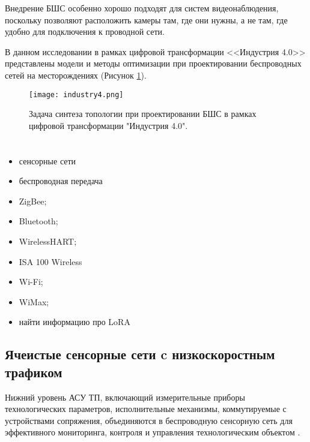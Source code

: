 Внедрение БШС особенно хорошо подходят для систем видеонаблюдения, поскольку позволяют расположить камеры там, где они нужны, а не там, где удобно для подключения к проводной сети.

В данном исследовании в рамках цифровой трансформации <<Индустрия 4.0>> представлены модели и методы оптимизации при проектировании беспроводных сетей на месторождениях  (Рисунок \cref{fig:industry4}).

\begin{figure}[h!]
  \centering
   \texttt{[image: industry4.png]}
\caption{Задача синтеза топологии при проектировании БШС в рамках цифровой трансформации "Индустрия 4.0".}
\label{fig:industry4}
\end{figure}






\section{}

\begin{itemize}
  \item сенсорные сети
  \item беспроводная передача 
\end{itemize}


\begin{itemize}
  \item ZigBee;
  \item Bluetooth;
  \item WirelessHART;
  \item ISA 100 Wireless
  \item Wi-Fi;
  \item WiMax;
  \item найти информацию про LoRA
\end{itemize}

\subsection{Ячеистые сенсорные сети c низкоскоростным трафиком}
Нижний уровень АСУ ТП, включающий измерительные приборы технологических параметров, исполнительные механизмы, коммутируемые с устройствами сопряжения, объединяются в беспроводную сенсорную сеть для эффективного мониторинга, контроля и управления технологическим объектом \cite{Florencio2020}.


